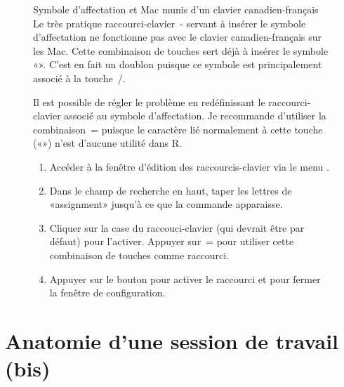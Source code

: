 \begin{figure}[t]
  \label{fig:rstudio:affectation}
  \begin{titled-frame}{Symbole d'affectation et
      Mac munis d'un clavier canadien-français}
    Le très pratique raccourci-clavier {\optkey\,-} servant à insérer
    le symbole d'affectation ne fonctionne pas avec le clavier
    canadien-français sur les Mac. Cette combinaison de touches sert
    déjà à insérer le symbole «\textbar». C'est en fait un doublon
    puisque ce symbole est principalement associé à la touche
    {\optkey\,/}.

    Il est possible de régler le problème en redéfinissant le
    raccourci-clavier associé au symbole d'affectation. Je recommande
    d'utiliser la combinaison {\optkey\,=} puisque le caractère lié
    normalement à cette touche («») n'est d'aucune utilité dans
    R.

    \begin{enumerate}
    \item Accéder à la fenêtre d'édition des raccourcis-clavier via le
      menu .
    \item Dans le champ de recherche en haut, taper les lettres de
      «assignment» jusqu'à ce que la commande  apparaisse.
    \item Cliquer sur la case du raccouci-clavier (qui devrait être
       par défaut) pour l'activer. Appuyer sur \optkey\,=
      pour utiliser cette combinaison de touches comme raccourci.
    \item Appuyer sur le bouton  pour activer le raccourci
      et pour fermer la fenêtre de configuration.
    \end{enumerate}

  \end{titled-frame}
\end{figure}


\section{Anatomie d'une session de travail (bis)}
\label{sec:rstudio:session}

